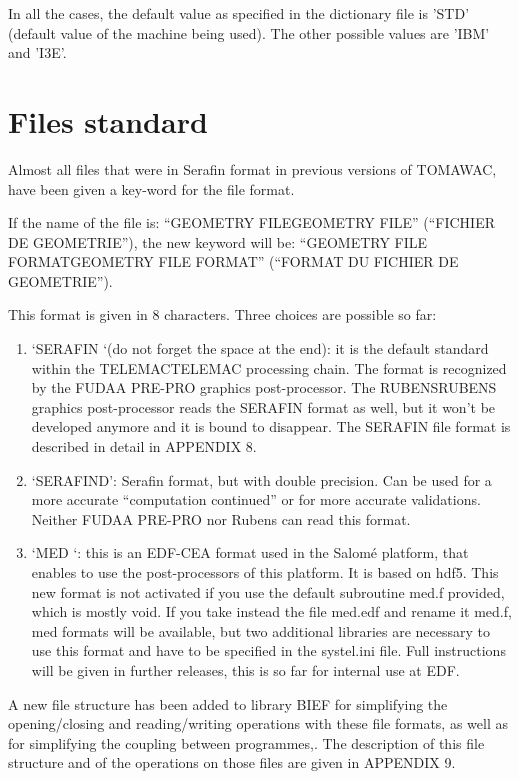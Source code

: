  In all the cases, the default value as specified in the dictionary file is 'STD' (default value of the machine being used). The other possible values are 'IBM' and 'I3E'.


\section{ Files standard}

 Almost all files that were in Serafin format in previous versions of TOMAWAC, have been given a key-word for the file format.

 If the name of the file is: ``GEOMETRY FILEGEOMETRY FILE'' (``FICHIER DE GEOMETRIE''), the new keyword will be: ``GEOMETRY FILE FORMATGEOMETRY FILE FORMAT'' (``FORMAT DU FICHIER DE GEOMETRIE'').

 This format is given in 8 characters. Three choices are possible so far:

\begin{enumerate}
\item  `SERAFIN `(do not forget the space at the end): it is the default standard within the TELEMACTELEMAC processing chain. The format is recognized by the FUDAA PRE-PRO graphics post-processor. The RUBENSRUBENS graphics post-processor reads the SERAFIN format as well, but it won't be developed anymore and it is bound to disappear. The SERAFIN file format is described in detail in APPENDIX 8.

\item  `SERAFIND': Serafin format, but with double precision. Can be used for a more accurate ``computation continued'' or for more accurate validations. Neither FUDAA PRE-PRO nor Rubens can read this format.

\item  `MED  `: this is an EDF-CEA format used in the Salomé platform, that enables to use the post-processors of this platform. It is based on hdf5. This new format is not activated if you use the default subroutine med.f provided, which is mostly void. If you take instead the file med.edf and rename it med.f, med formats will be available, but two additional libraries are necessary to use this format and have to be specified in the systel.ini file. Full instructions will be given in further releases, this is so far for internal use at EDF.
\end{enumerate}

 A new file structure has been added to library BIEF for simplifying the opening/closing and reading/writing operations with these file formats, as well as for simplifying the coupling between programmes,. The description of this file structure and of the operations on those files are given in APPENDIX 9.

